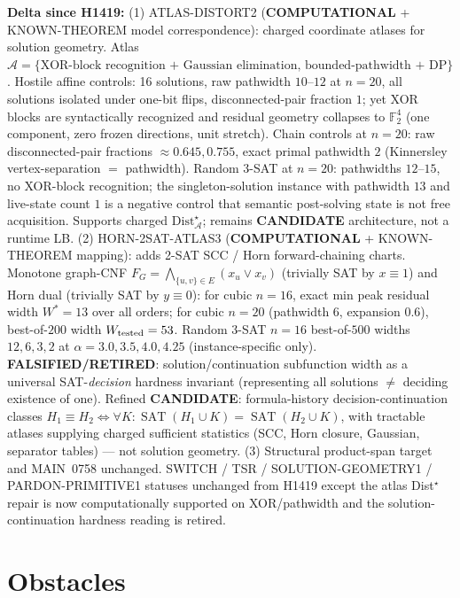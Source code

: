 \documentclass[11pt]{article}
\begin{document}
\textbf{Delta since H1419:}
(1) ATLAS-DISTORT2 (\textbf{COMPUTATIONAL} + KNOWN-THEOREM model correspondence):
charged coordinate atlases for solution geometry.
Atlas $\mathcal A=\{\text{XOR-block recognition + Gaussian elimination},\,
\text{bounded-pathwidth + DP}\}$.
Hostile affine controls: 16 solutions, raw pathwidth $10$--$12$ at $n=20$,
all solutions isolated under one-bit flips, disconnected-pair fraction $1$;
yet XOR blocks are syntactically recognized and residual geometry collapses to
$\mathbb F_2^4$ (one component, zero frozen directions, unit stretch).
Chain controls at $n=20$: raw disconnected-pair fractions $\approx 0.645,0.755$,
exact primal pathwidth $\boxed{2}$ (Kinnersley vertex-separation $=$ pathwidth).
Random 3-SAT at $n=20$: pathwidths $12$--$15$, no XOR-block recognition;
the singleton-solution instance with pathwidth $13$ and live-state count $1$
is a negative control that semantic post-solving state is not free acquisition.
Supports charged $\mathrm{Dist}_{\mathcal A}^\star$; remains \textbf{CANDIDATE} architecture,
not a runtime LB.
(2) HORN-2SAT-ATLAS3 (\textbf{COMPUTATIONAL} + KNOWN-THEOREM mapping):
adds 2-SAT SCC / Horn forward-chaining charts.
Monotone graph-CNF $F_G=\bigwedge_{\{u,v\}\in E}(x_u\vee x_v)$ (trivially SAT by $x\equiv 1$)
and Horn dual (trivially SAT by $y\equiv 0$):
for cubic $n=16$, exact min peak residual width $W^*=13$ over all orders;
for cubic $n=20$ (pathwidth $6$, expansion $0.6$), best-of-$200$ width $W_{\rm tested}=53$.
Random 3-SAT $n=16$ best-of-$500$ widths $12,6,3,2$ at $\alpha=3.0,3.5,4.0,4.25$
(instance-specific only).
\textbf{FALSIFIED/RETIRED}: solution/continuation subfunction width as a universal
SAT-\emph{decision} hardness invariant
(representing all solutions $\neq$ deciding existence of one).
Refined \textbf{CANDIDATE}: formula-history decision-continuation classes
$H_1\equiv H_2\iff\forall K:\operatorname{SAT}(H_1\cup K)=\operatorname{SAT}(H_2\cup K)$,
with tractable atlases supplying charged sufficient statistics
(SCC, Horn closure, Gaussian, separator tables) --- not solution geometry.
(3) Structural product-span target and MAIN~0758 unchanged.
SWITCH / TSR / SOLUTION-GEOMETRY1 / PARDON-PRIMITIVE1 statuses unchanged from H1419
except the atlas Dist$^\star$ repair is now computationally supported on XOR/pathwidth
and the solution-continuation hardness reading is retired.

\section*{Obstacles}
\end{document}
